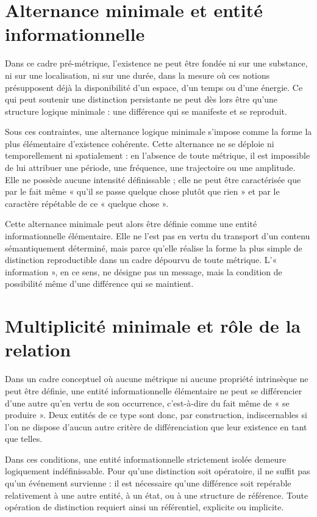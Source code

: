 \documentclass[11pt,a4paper]{article}
\begin{document}
\section{Alternance minimale et entité informationnelle}

Dans ce cadre pré-métrique, l’existence ne peut être fondée ni sur une substance, ni sur une localisation, ni sur une durée, dans la mesure où ces notions présupposent déjà la disponibilité d’un espace, d’un temps ou d’une énergie. Ce qui peut soutenir une distinction persistante ne peut dès lors être qu’une structure logique minimale : une différence qui se manifeste et se reproduit.

Sous ces contraintes, une alternance logique minimale s’impose comme la forme la plus élémentaire d’existence cohérente. Cette alternance ne se déploie ni temporellement ni spatialement : en l’absence de toute métrique, il est impossible de lui attribuer une période, une fréquence, une trajectoire ou une amplitude. Elle ne possède aucune intensité définissable ; elle ne peut être caractérisée que par le fait même « qu’il se passe quelque chose plutôt que rien » et par le caractère répétable de ce « quelque chose ».

Cette alternance minimale peut alors être définie comme une entité informationnelle élémentaire. Elle ne l’est pas en vertu du transport d’un contenu sémantiquement déterminé, mais parce qu’elle réalise la forme la plus simple de distinction reproductible dans un cadre dépourvu de toute métrique. L’« information », en ce sens, ne désigne pas un message, mais la condition de possibilité même d’une différence qui se maintient.

\section{Multiplicité minimale et rôle de la relation}

Dans un cadre conceptuel où aucune métrique ni aucune propriété intrinsèque ne peut être définie, une entité informationnelle élémentaire ne peut se différencier d’une autre qu’en vertu de son occurrence, c’est-à-dire du fait même de « se produire ». Deux entités de ce type sont donc, par construction, indiscernables si l’on ne dispose d’aucun autre critère de différenciation que leur existence en tant que telles.

Dans ces conditions, une entité informationnelle strictement isolée demeure logiquement indéfinissable. Pour qu’une distinction soit opératoire, il ne suffit pas qu’un événement survienne : il est nécessaire qu’une différence soit repérable relativement à une autre entité, à un état, ou à une structure de référence. Toute opération de distinction requiert ainsi un référentiel, explicite ou implicite.
\end{document}
